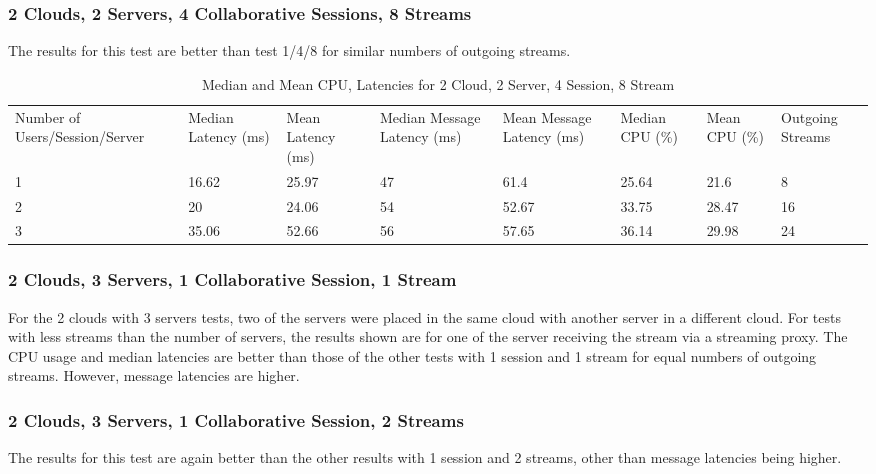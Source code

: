\subsubsection{2 Clouds, 2 Servers, 4 Collaborative Sessions, 8 Streams}

The results for this test are better than test 1/4/8 for similar numbers of outgoing streams.

\begin{table}
\caption{Median and Mean CPU, Latencies for 2 Cloud, 2 Server, 4 Session, 8 Stream}
\label{table:2cld_2serv_4sess_8str}
\begin{tabu} to\linewidth{|X[c]|X[c]|X[c]|X[c]|X[c]|X[c]|X[c]|X[c]|}
\everyrow{\hline}
\hline
Number of Users/Session/Server & Median Latency (ms) & Mean Latency (ms) & Median Message Latency (ms) & Mean Message Latency (ms) & Median CPU (\%) & Mean CPU (\%) & Outgoing Streams\\
1 & 16.62 & 25.97 & 47 & 61.4 & 25.64 & 21.6 & 8 \\
2 & 20 & 24.06 & 54 & 52.67 & 33.75 & 28.47 & 16 \\
3 & 35.06 & 52.66 & 56 & 57.65 & 36.14 & 29.98 & 24 \\
\end{tabu}
\end{table}

\subsubsection{2 Clouds, 3 Servers, 1 Collaborative Session, 1 Stream}

For the 2 clouds with 3 servers tests, two of the servers were placed in the same cloud with another server in a different cloud. For tests with less streams than the number of servers, the results shown are for one of the server receiving the stream via a streaming proxy. The CPU usage and median latencies are better than those of the other tests with 1 session and 1 stream for equal numbers of outgoing streams. However, message latencies are higher.

\subsubsection{2 Clouds, 3 Servers, 1 Collaborative Session, 2 Streams}

The results for this test are again better than the other results with 1 session and 2 streams, other than message latencies being higher.

